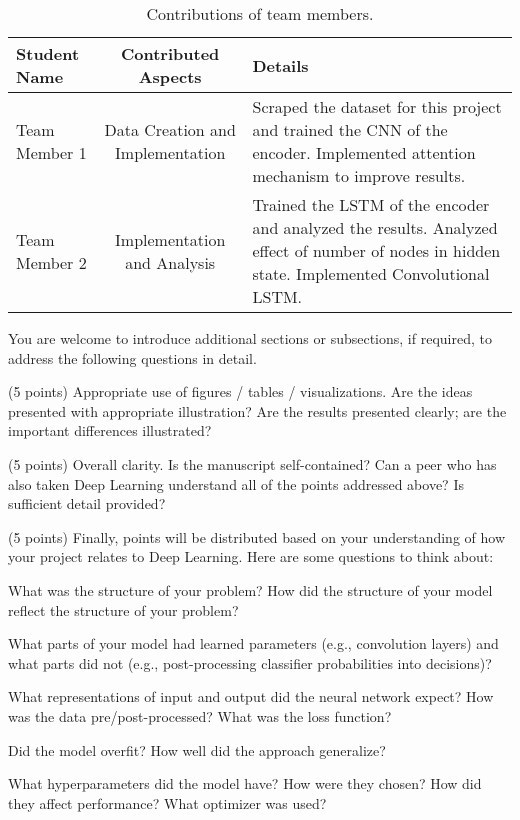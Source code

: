 \documentclass[10pt,twocolumn,letterpaper]{article}
\begin{document}
\begin{table*}
\begin{center}
\begin{tabular}{|l|c|p{8cm}|}
\hline
Student Name & Contributed Aspects & Details \\
\hline\hline
Team Member 1 & Data Creation and Implementation & Scraped the dataset for this project and trained the CNN of the encoder. Implemented attention mechanism to improve results. \\
Team Member 2 & Implementation and Analysis & Trained the LSTM of the encoder and analyzed the results. Analyzed effect of number of nodes in hidden state.  Implemented Convolutional LSTM. \\
\hline
\end{tabular}
\end{center}
\caption{Contributions of team members.}
\label{tab:contributions}
\end{table*}



You are welcome to introduce additional sections or subsections, if required, to address the following questions in detail. 

(5 points) Appropriate use of figures / tables / visualizations. Are the ideas presented with appropriate illustration? Are the results presented clearly; are the important differences illustrated? 

(5 points) Overall clarity. Is the manuscript self-contained? Can a peer who has also taken Deep Learning understand all of the points addressed above? Is sufficient detail provided? 

(5 points) Finally, points will be distributed based on your understanding of how your project relates to Deep Learning. Here are some questions to think about: 

What was the structure of your problem? How did the structure of your model reflect the structure of your problem? 

What parts of your model had learned parameters (e.g., convolution layers) and what parts did not (e.g., post-processing classifier probabilities into decisions)? 

What representations of input and output did the neural network expect? How was the data pre/post-processed?
What was the loss function? 

Did the model overfit? How well did the approach generalize? 

What hyperparameters did the model have? How were they chosen? How did they affect performance? What optimizer was used? 
\end{document}
